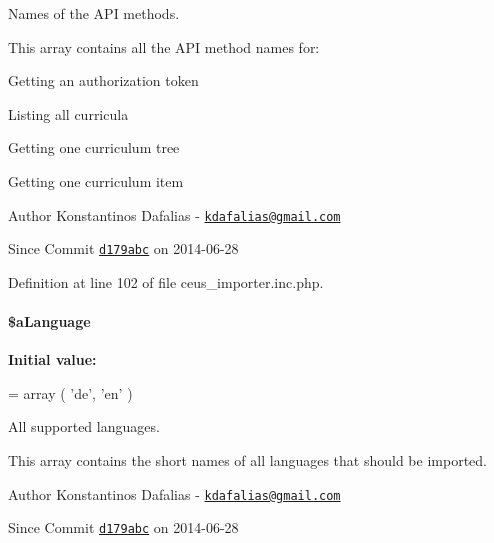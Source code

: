 Names of the A\+P\+I methods. 

This array contains all the A\+P\+I method names for\+:
\begin{DoxyItemize}
\item Getting an authorization token
\item Listing all curricula
\item Getting one curriculum tree
\item Getting one curriculum item
\end{DoxyItemize}

\begin{DoxyAuthor}{Author}
Konstantinos Dafalias -\/ \href{mailto:kdafalias@gmail.com}{\tt kdafalias@gmail.\+com} 
\end{DoxyAuthor}
\begin{DoxySince}{Since}
Commit \href{http://github.com/TheJake123/DrupalModul/commit/d179abcc5e05743086cd67cf1ce30b08923a7183}{\tt d179abc} on 2014-\/06-\/28 
\end{DoxySince}


Definition at line 102 of file ceus\+\_\+importer.\+inc.\+php.

\hypertarget{classceus__importer_a87139169928b8a390915f5962c56f814}{
\paragraph[{\$a\+Language}]{\setlength{\rightskip}{0pt plus 5cm}\$a\+Language\hspace{0.3cm}{\ttfamily [private]}}}\label{classceus__importer_a87139169928b8a390915f5962c56f814}
{\bfseries Initial value\+:}
\begin{DoxyCode}
= array (
            \textcolor{stringliteral}{'de'},
            \textcolor{stringliteral}{'en'} 
    )
\end{DoxyCode}


All supported languages. 

This array contains the short names of all languages that should be imported.

\begin{DoxyAuthor}{Author}
Konstantinos Dafalias -\/ \href{mailto:kdafalias@gmail.com}{\tt kdafalias@gmail.\+com} 
\end{DoxyAuthor}
\begin{DoxySince}{Since}
Commit \href{http://github.com/TheJake123/DrupalModul/commit/d179abcc5e05743086cd67cf1ce30b08923a7183}{\tt d179abc} on 2014-\/06-\/28 
\end{DoxySince}


